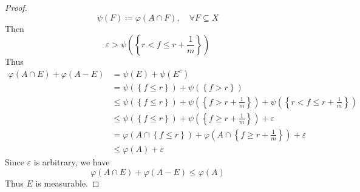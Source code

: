 \documentclass[../main.tex]{subfiles}
\begin{document}
\begin{proof}
\[    \psi \left( F \right)\coloneqq  \varphi \left( A\cap F \right),\quad \forall F\subseteq X
    \]  Then \[
     \varepsilon > \psi \left( \left\{ r< f\le r+ \frac{1 }{m }  \right\} \right)
    \] Thus \[
    \begin{aligned}
     \varphi \left( A\cap E \right)+  \varphi \left( A-E \right)&= \psi \left( E \right)+ \psi \left( E^{c} \right)\\ 
      &= \psi \left( \left\{ f\le r \right\} \right)+ \psi \left( \left\{ f> r \right\} \right)       \\ 
       &\le  \psi \left( \left\{ f\le r \right\} \right)+ \psi \left( \left\{ f>  r+ \frac{1 }{m } \right\} \right)+ \psi \left( \left\{ r< f\le r+ \frac{1 }{m }  \right\} \right)   \\ 
        &\le \psi \left( \left\{ f\le r \right\} \right) + \psi \left( \left\{ f\ge r+ \frac{1 }{m }  \right\} \right) +  \varepsilon \\ 
         &=  \varphi \left( A\cap \left\{ f\le r \right\} \right)+  \varphi \left( A\cap \left\{ f\ge r+ \frac{1 }{m }  \right\} \right)+  \varepsilon   \\ 
          &\le  \varphi \left( A \right)+  \varepsilon  
    \end{aligned}
    \]Since \(   \varepsilon   \) is arbitrary, we have \[
     \varphi \left( A\cap E \right)+  \varphi \left( A-E \right)\le  \varphi \left( A \right)   
    \] Thus \(  E  \) is measurable. 
\end{proof}
\end{document}
